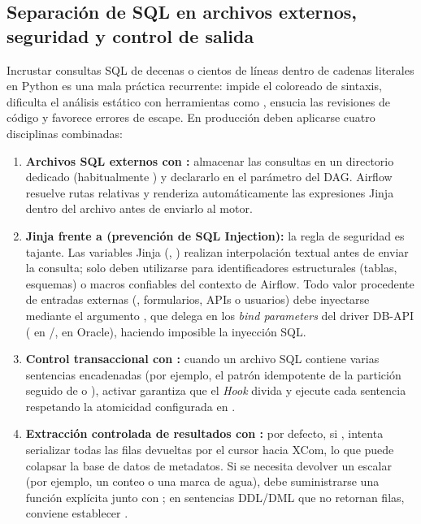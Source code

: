 \subsection{Separación de SQL en archivos externos, seguridad y control de salida}

Incrustar consultas SQL de decenas o cientos de líneas dentro de cadenas literales en Python es una mala práctica recurrente: impide el coloreado de sintaxis, dificulta el análisis estático con herramientas como , ensucia las revisiones de código y favorece errores de escape. En producción deben aplicarse cuatro disciplinas combinadas:

\begin{enumerate}
  \item \textbf{Archivos SQL externos con :} almacenar las consultas en un directorio dedicado (habitualmente ) y declararlo en el parámetro  del DAG. Airflow resuelve rutas relativas y renderiza automáticamente las expresiones Jinja dentro del archivo  antes de enviarlo al motor.
  \item \textbf{Jinja frente a  (prevención de SQL Injection):} la regla de seguridad es tajante. Las variables Jinja (, ) realizan interpolación textual antes de enviar la consulta; solo deben utilizarse para identificadores estructurales (tablas, esquemas) o macros confiables del contexto de Airflow. Todo valor procedente de entradas externas (, formularios, APIs o usuarios) debe inyectarse mediante el argumento , que delega en los \textit{bind parameters} del driver DB-API ( en /,  en Oracle), haciendo imposible la inyección SQL.
  \item \textbf{Control transaccional con :} cuando un archivo SQL contiene varias sentencias encadenadas (por ejemplo, el patrón idempotente  de la partición seguido de  o ), activar  garantiza que el \textit{Hook} divida y ejecute cada sentencia respetando la atomicidad configurada en .
  \item \textbf{Extracción controlada de resultados con :} por defecto, si ,  intenta serializar todas las filas devueltas por el cursor hacia XCom, lo que puede colapsar la base de datos de metadatos. Si se necesita devolver un escalar (por ejemplo, un conteo o una marca de agua), debe suministrarse una función  explícita junto con ; en sentencias DDL/DML que no retornan filas, conviene establecer .
\end{enumerate}

